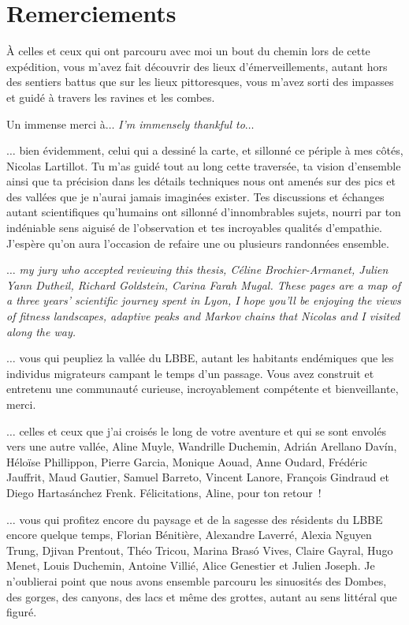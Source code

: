﻿\thispagestyle{empty}
\section*{Remerciements}

À celles et ceux qui ont parcouru avec moi un bout du chemin lors de cette expédition, vous m’avez fait découvrir des lieux d’émerveillements, autant hors des sentiers battus que sur les lieux pittoresques, vous m’avez sorti des impasses et guidé à travers les ravines et les combes.

Un immense merci à$\hdots$ \textit{I’m immensely thankful to$\hdots$}

$\hdots$ bien évidemment, celui qui a dessiné la carte, et sillonné ce périple à mes côtés, Nicolas Lartillot.
Tu m’as guidé tout au long cette traversée, ta vision d’ensemble ainsi que ta précision dans les détails techniques nous ont amenés sur des pics et des vallées que je n’aurai jamais imaginées exister.
Tes discussions et échanges autant scientifiques qu’humains ont sillonné d'innombrables sujets, nourri par ton indéniable sens aiguisé de l’observation et tes incroyables qualités d’empathie.
J’espère qu’on aura l’occasion de refaire une ou plusieurs randonnées ensemble.

$\hdots$ \textit{my jury who accepted reviewing this thesis, Céline Brochier-Armanet, Julien Yann Dutheil, Richard Goldstein, Carina Farah Mugal.
These pages are a map of a three years’ scientific journey spent in Lyon, I hope you’ll be enjoying the views of fitness landscapes, adaptive peaks and Markov chains that Nicolas and I visited along the way.}

$\hdots$ vous qui peupliez la vallée du LBBE, autant les habitants endémiques que les individus migrateurs campant le temps d’un passage.
Vous avez construit et entretenu une communauté curieuse, incroyablement compétente et bienveillante, merci.

$\hdots$ celles et ceux que j’ai croisés le long de votre aventure et qui se sont envolés vers une autre vallée, Aline Muyle, Wandrille Duchemin, Adrián Arellano Davín, Héloïse Phillippon, Pierre Garcia, Monique Aouad, Anne Oudard, Frédéric Jauffrit, Maud Gautier, Samuel Barreto, Vincent Lanore, François Gindraud et Diego Hartasánchez Frenk.
Félicitations, Aline, pour ton retour~!

$\hdots$ vous qui profitez encore du paysage et de la sagesse des résidents du LBBE encore quelque temps, Florian Bénitière, Alexandre Laverré, Alexia Nguyen Trung, Djivan Prentout, Théo Tricou, Marina Brasó Vives, Claire Gayral, Hugo Menet, Louis Duchemin, Antoine Villié, Alice Genestier et Julien Joseph.
Je n’oublierai point que nous avons ensemble parcouru les sinuosités des Dombes, des gorges, des canyons, des lacs et même des grottes, autant au sens littéral que figuré.

